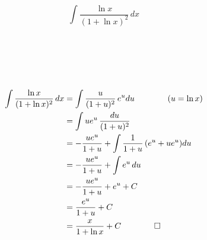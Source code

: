 \documentclass{article}
\begin{document}
	$$ \int \frac{\ln x}{(1+\ln x)^2} \,dx$$
	\\
	\\
	\\
	\\
	\\
	\begin{align*}
		\int \frac{\ln x}{(1+\ln x)^2} \,dx 
		&= \int \frac{u}{(1+u)^2} \,e^udu \qquad \qquad (u = \ln x)\\
		&= \int ue^u \,\frac{du}{(1+u)^2} \\
		&= -\frac{ue^u}{1+u} + \int \frac{1}{1+u} \,(e^u+ue^u)du \\
		&= -\frac{ue^u}{1+u} + \int e^u \,du \\
		&= -\frac{ue^u}{1+u} + e^u + C \\
		&=   \frac{e^u}{1+u} + C \\
		&= \frac{x}{1 +\ln x} + C 
		\qquad \qed
	\end{align*}
\end{document}
